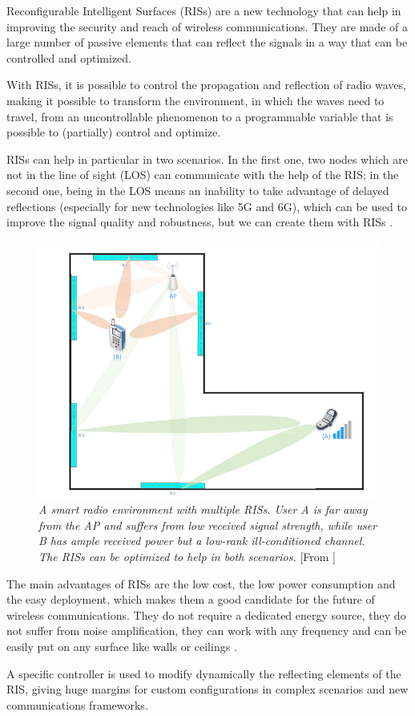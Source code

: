 Reconfigurable Intelligent Surfaces (RISs) are a new technology that can help in improving the security and reach of wireless communications. They are made of a large number of passive elements that can reflect the signals in a way that can be controlled and optimized.

With RISs, it is possible to control the propagation and reflection of radio waves, making it possible to transform the environment, in which the waves need to travel, from an uncontrollable phenomenon to a programmable variable that is possible to (partially) control and optimize.

RISs can help in particular in two scenarios. In the first one, two nodes which are not in the line of sight (LOS) can communicate with the help of the RIS; in the second one, being in the LOS means an inability to take advantage of delayed reflections (especially for new technologies like 5G and 6G), which can be used to improve the signal quality and robustness, but we can create them with RISs \cite{9086766}.

\begin{figure}[H]
  \centering
  \includegraphics[width=0.5\linewidth]{imgs/RIS enviroment.png}
  \caption{\textit{A smart radio environment with multiple RISs. User A is far away
      from the AP and suffers from low received signal strength, while user B has
      ample received power but a low-rank ill-conditioned channel. The RISs can
      be optimized to help in both scenarios.} [From \cite{9086766}]}
\end{figure}

The main advantages of RISs are the low cost, the low power consumption and the easy deployment, which makes them a good candidate for the future of wireless communications. They do not require a dedicated energy source, they do not suffer from noise amplification, they can work with any frequency and can be easily put on any surface like walls or ceilings \cite{8796365}.

A specific controller is used to modify dynamically the reflecting elements of the RIS, giving huge margins for custom configurations in complex scenarios and new communications frameworks.

